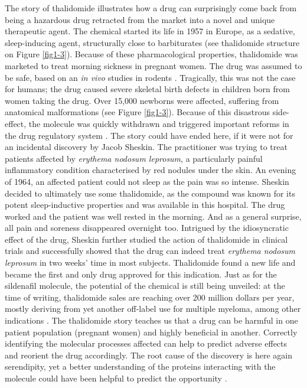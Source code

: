 The story of thalidomide illustrates how a drug can surprisingly come back from being a hazardous drug retracted from the market into a novel and unique therapeutic agent. The chemical started its life in 1957 in Europe, as a sedative, sleep-inducing agent, structurally close to barbiturates (see thalidomide structure on Figure \ref{fig1-3}). Because of these pharmacological properties, thalidomide was marketed to treat morning sickness in pregnant women. The drug was assumed to be safe, based on an \emph{in vivo} studies in rodents \citep{stephens2009dark}. Tragically, this was not the case for humans; the drug caused severe skeletal birth defects in children born from women taking the drug. Over 15,000 newborns were affected, suffering from anatomical malformations (see Figure \ref{fig1-3}). Because of this disastrous side-effect, the molecule was quickly withdrawn and triggered important reforms in the drug regulatory system \citep{stephens2009dark}. The story could have ended here, if it were not for an incidental discovery by Jacob Sheskin. The practitioner was trying to treat patients affected by \emph{erythema nodosum leprosum}, a particularly painful inflammatory condition characterised by red nodules under the skin. An evening of 1964, an affected patient could not sleep as the pain was so intense. Sheskin decided to ultimately use some thalidomide, as the compound was known for its potent sleep-inductive properties and was available in this hospital. The drug worked and the patient was well rested in the morning. And as a general surprise, all pain and soreness disappeared overnight too. Intrigued by the idiosyncratic effect of the drug, Sheskin further studied the action of thalidomide in clinical trials \citep{barratt2012drug} and successfully showed that the drug can indeed treat \emph{erythema nodosum leprosum} in two weeks' time in most subjects. Thalidomide found a new life and became the first and only drug approved for this indication. Just as for the sildenafil molecule, the potential of the chemical is still being unveiled: at the time of writing, thalidomide sales are reaching over 200 million dollars per year, mostly deriving from yet another off-label use for multiple myeloma, among other indications \citep{ashburn2004drug}. The thalidomide story teaches us that a drug can be harmful in one patient population (pregnant women) and highly beneficial in another. Correctly identifying the molecular processes affected can help to predict adverse effects and reorient the drug accordingly. The root cause of the discovery is here again serendipity, yet a better understanding of the proteins interacting with the molecule could have been helpful to predict the opportunity \citep{sampaio1991thalidomide}.

